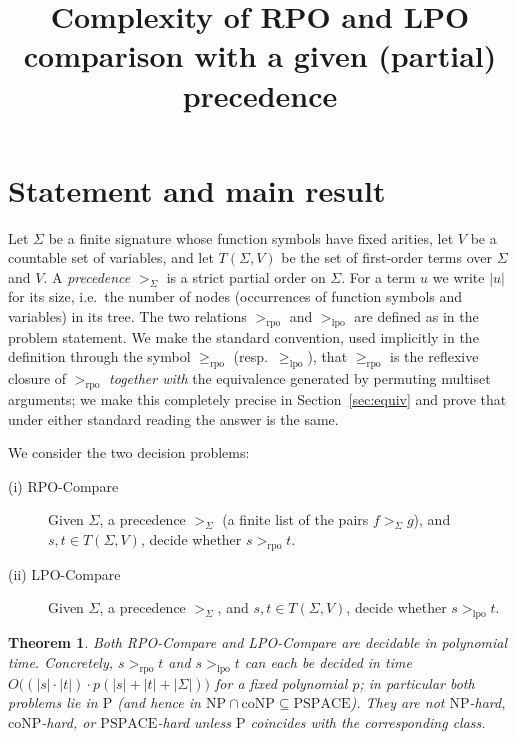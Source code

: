 \documentclass{amsart}
\newtheorem{theorem}{Theorem}
\theoremstyle{definition}
\theoremstyle{remark}
\newcommand{\rpo}{>_{\mathrm{rpo}}}
\newcommand{\rpoe}{\ge_{\mathrm{rpo}}}
\newcommand{\lpo}{>_{\mathrm{lpo}}}
\newcommand{\lpoe}{\ge_{\mathrm{lpo}}}
\newcommand{\sig}{\Sigma}
\newcommand{\prc}{>_{\sig}}
\newcommand{\T}{T(\sig,V)}
\newcommand{\size}[1]{|#1|}
\begin{document}
\title{Complexity of RPO and LPO comparison with a given (partial) precedence}
\maketitle

\section{Statement and main result}

Let $\sig$ be a finite signature whose function symbols have fixed arities, let
$V$ be a countable set of variables, and let $\T$ be the set of first-order terms
over $\sig$ and $V$. A \emph{precedence} $\prc$ is a strict partial order on
$\sig$. For a term $u$ we write $\size{u}$ for its size, i.e.\ the number of
nodes (occurrences of function symbols and variables) in its tree. The two
relations $\rpo$ and $\lpo$ are defined as in the problem statement. We make the
standard convention, used implicitly in the definition through the symbol
$\rpoe$ (resp.\ $\lpoe$), that $\rpoe$ is the reflexive closure of $\rpo$
\emph{together with} the equivalence generated by permuting multiset arguments;
we make this completely precise in Section~\ref{sec:equiv} and prove that under
either standard reading the answer is the same.

We consider the two decision problems:
\begin{description}
\item[(i) {\sc RPO-Compare}] Given $\sig$, a precedence $\prc$ (a finite list of
the pairs $f \prc g$), and $s,t\in\T$, decide whether $s \rpo t$.
\item[(ii) {\sc LPO-Compare}] Given $\sig$, a precedence $\prc$, and $s,t\in\T$,
decide whether $s \lpo t$.
\end{description}

\begin{theorem}\label{thm:main}
Both {\sc RPO-Compare} and {\sc LPO-Compare} are decidable in polynomial time.
Concretely, $s\rpo t$ and $s\lpo t$ can each be decided in time
$O\bigl((\size{s}\cdot\size{t})\cdot p(\size{s}+\size{t}+\size{\sig})\bigr)$ for
a fixed polynomial $p$; in particular both problems lie in $\mathrm{P}$ (and
hence in $\mathrm{NP}\cap\mathrm{coNP}\subseteq\mathrm{PSPACE}$). They are not
$\mathrm{NP}$-hard, $\mathrm{coNP}$-hard, or $\mathrm{PSPACE}$-hard unless
$\mathrm{P}$ coincides with the corresponding class.
\end{theorem}
\end{document}
